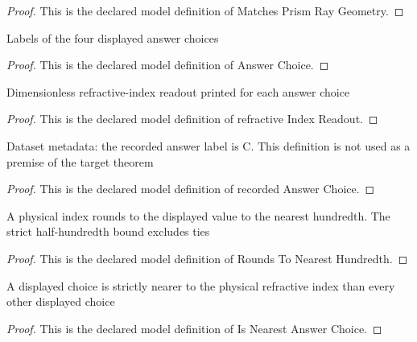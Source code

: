 \begin{proof}
  This is the declared model definition of Matches Prism Ray Geometry.
\end{proof}
\begin{definition}
  \label{def:physics:phyx-mini-0006:phyxminiproblems-problemphyxmini0006-answerchoice}
  Labels of the four displayed answer choices
\end{definition}
\begin{proof}
  This is the declared model definition of Answer Choice.
\end{proof}
\begin{definition}
  \label{def:physics:phyx-mini-0006:phyxminiproblems-problemphyxmini0006-answerchoice-refractiveindexreadout}
  Dimensionless refractive-index readout printed for each answer choice
\end{definition}
\begin{proof}
  This is the declared model definition of refractive Index Readout.
\end{proof}
\begin{definition}
  \label{def:physics:phyx-mini-0006:phyxminiproblems-problemphyxmini0006-recordedanswerchoice}
  Dataset metadata: the recorded answer label is C. This definition is not used as a premise of the target theorem
\end{definition}
\begin{proof}
  This is the declared model definition of recorded Answer Choice.
\end{proof}
\begin{definition}
  \label{def:physics:phyx-mini-0006:phyxminiproblems-problemphyxmini0006-roundstonearesthundredth}
  A physical index rounds to the displayed value to the nearest hundredth. The strict half-hundredth bound excludes ties
\end{definition}
\begin{proof}
  This is the declared model definition of Rounds To Nearest Hundredth.
\end{proof}
\begin{definition}
  \label{def:physics:phyx-mini-0006:phyxminiproblems-problemphyxmini0006-isnearestanswerchoice}
  A displayed choice is strictly nearer to the physical refractive index than every other displayed choice
\end{definition}
\begin{proof}
  This is the declared model definition of Is Nearest Answer Choice.
\end{proof}

